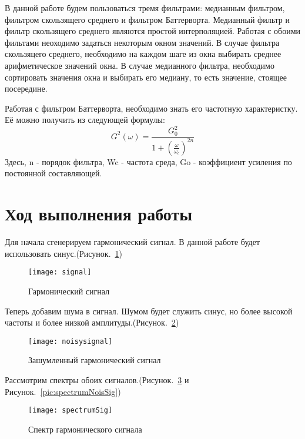В данной работе будем пользоваться тремя фильтрами: медианным фильтром, фильтром скользящего среднего и фильтром Баттерворта.
Медианный фильтр и фильтр скользящего среднего являются простой интерполяцией. Работая с обоими фильтами неоходимо задаться некоторым окном значений. В случае фильтра скользяцего среднего, необходимо на каждом шаге из окна выбирать среднее арифметическое значений окна. В случае медианного фильтра, необходимо сортировать значения окна и выбирать его медиану, то есть значение, стоящее посередине.

Работая с фильтром Баттерворта, необходимо знать его частотную характеристку. Её можно получить из следующей формулы:
\begin{equation}G^2(\omega) =  \frac{G_0^2}{1 + (\frac{\omega}{\omega_c})^{2n}}\end{equation}
Здесь, n - порядок фильтра, Wc - частота среда, Go - коэффициент усиления по постоянной составляющей.
\section{Ход выполнения работы}
Для начала сгенерируем гармонический сигнал. В данной работе будет использовать синус.(Рисунок.~\ref{pic:signal})

\begin{figure}[H]
	\begin{center}
		\texttt{[image: signal]}
		\caption{Гармонический сигнал} 
		\label{pic:signal} %
	\end{center}
\end{figure}

Теперь добавим шума в сигнал. Шумом будет служить синус, но более высокой частоты и более низкой амплитуды.(Рисунок.~\ref{pic:noisysignal})


\begin{figure}[H]
	\begin{center}
		\texttt{[image: noisysignal]}
		\caption{Зашумленный гармонический сигнал} 
		\label{pic:noisysignal} %
	\end{center}
\end{figure}

Рассмотрим спектры обоих сигналов.(Рисунок.~\ref{pic:spectrumSig} и Рисунок.~\ref{pic:spectrumNoisSig})

\begin{figure}[H]
	\begin{center}
		\texttt{[image: spectrumSig]}
		\caption{Спектр гармонического сигнала} 
		\label{pic:spectrumSig} %
	\end{center}
\end{figure}

